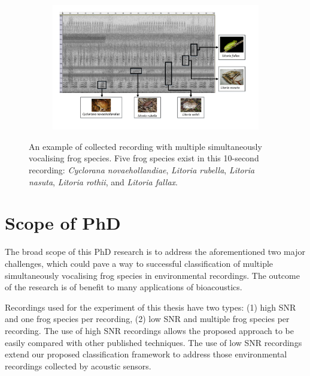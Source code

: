 \begin{figure}[htb!]
\centering
    \begin{subfigure}[b]{\textwidth}
           \includegraphics[width=1\textwidth]{image/LR/label.pdf}
    \end{subfigure}%
\caption[An example of collected recording]{An example of collected recording with multiple simultaneously vocalising frog species. Five frog species exist in this 10-second recording: \textit{Cyclorana novaehollandiae}, \textit{Litoria rubella}, \textit{Litoria nasuta}, \textit{Litoria rothii}, and \textit{Litoria fallax}.}
\label{fig:label}       
\end{figure}






\section{Scope of PhD}
The broad scope of this PhD research is to address the aforementioned two  major challenges, which could pave a way to successful classification of multiple simultaneously vocalising frog species in environmental recordings. The outcome of the research is of benefit to many applications of bioacoustics.


Recordings used for the experiment of this thesis have two types: (1) high SNR and one frog species per recording, (2) low SNR and multiple frog species per recording. The use of high SNR recordings allows the proposed approach to be easily compared with other published techniques. The use of low SNR recordings extend our proposed classification framework to address those environmental recordings collected by acoustic sensors.






